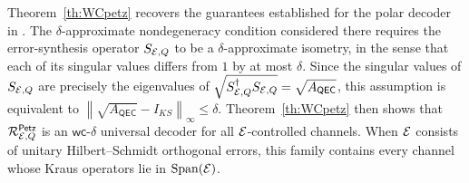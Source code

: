\documentclass[10pt]{article}
\DeclareMathOperator{\Span}{Span}
\newcommand{\norm}[1]{\left\|#1\right\|}
\newcommand{\s}[1]{\mathsf{#1}}
\begin{document}
\begin{remark} Theorem~\ref{th:WCpetz} recovers the guarantees established for the polar decoder in \cite{ma2025haar}. The $\delta$-approximate nondegeneracy condition considered there requires the error-synthesis operator $S_{{\cal E},Q}$ to be a $\delta$-approximate isometry, in the sense that each of its singular values differs from $1$ by at most $\delta$. Since the singular values of $S_{{\cal E},Q}$ are precisely the eigenvalues of $\sqrt{S_{\calE,Q}^{\dag}S_{\calE,Q}} = \sqrt{A_{\s{QEC}}}$, this assumption is equivalent to $\norm{\sqrt{A_{\s{QEC}}}-I_{KS}}_{\infty} \leq \delta.$ Theorem~\ref{th:WCpetz} then shows that $\calR_{\calE,Q}^{\s{Petz}}$ is an $\s{wc}$-$\delta$ universal decoder for all ${\cal E}$-controlled channels. When ${\cal E}$ consists of unitary Hilbert--Schmidt orthogonal errors, this family contains every channel whose Kraus operators lie in $\Span(\calE)$. \end{remark}
\end{document}
